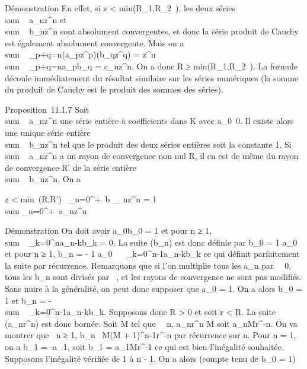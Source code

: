 \documentclass[]{article}
\begin{document}
Démonstration En effet, si \textbar{}z\textbar{}
\textless{} min(R\_1,R\_2~),
les deux séries \\sum ~
a\_nz^n et
\\sum ~
b\_nz^n sont absolument convergentes, et donc la
série produit de Cauchy est également absolument convergente. Mais on a
\\sum ~
\_p+q=n(a\_pz^p)(b\_qz^q) =
z^n \\sum ~
\_p+q=na\_pb\_q = c\_nz^n. On a
donc R ≥ min(R\_1,R\_2~). La
formule découle immédiatement du résultat similaire sur les séries
numériques (la somme du produit de Cauchy est le produit des sommes des
séries).

Proposition~11.1.7 Soit
\\sum ~
a\_nz^n une série entière à coefficients dans K avec
a\_0\neq~0. Il existe alors une unique
série entière \\sum ~
b\_nz^n tel que le produit des deux séries entières
soit la constante 1. Si
\\sum ~
a\_nz^n a un rayon de convergence non nul R, il en
est de même du rayon de convergence R' de la série entière
\\sum ~
b\_nz^n. On a

\textbar{}z\textbar{} \textless{} min~(R,R')
\rigtharrow~\sum \_n=0^+\infty~b~\_
nz^n = 1 \over \\sum
\_n=0^+\infty~a\_nz^n

Démonstration On doit avoir a\_0b\_0 = 1 et pour n ≥ 1,
\\sum ~
\_k=0^na\_n-kb\_k = 0. La suite
(b\_n) est donc définie par b\_0 = 1
\over a\_0 et pour n ≥ 1, b\_n = - 1
\over a\_0 \
\sum ~
\_k=0^n-1a\_n-kb\_k ce qui définit
parfaitement la suite par récurrence. Remarquons que si l'on multiplie
tous les a\_n par \lambda~\neq~0, tous les
b\_n sont divisés par \lambda~, et les rayons de convergence ne sont
pas modifiés. Sans nuire à la généralité, on peut donc supposer que
a\_0 = 1. On a alors b\_0 = 1 et b\_n =
-\\sum ~
\_k=0^n-1a\_n-kb\_k. Supposons donc R
\textgreater{} 0 et soit r \textless{} R. La suite
(a\_nr^n) est donc bornée. Soit M tel que
\forall~~n,
\textbar{}a\_n\textbar{}r^n \leq M soit
\textbar{}a\_n\textbar{}\leq Mr^-n. On va montrer que
\forall~n ≥ 1, \textbar{}b\_n~\textbar{}\leq
M(M + 1)^n-1r^-n par récurrence sur n. Pour n = 1,
on a b\_1 = -a\_1, soit \textbar{}b\_1\textbar{}
= \textbar{}a\_1\textbar{}\leq Mr^-1 ce qui est bien
l'inégalité souhaitée. Supposons l'inégalité vérifiée de 1 à n - 1. On a
alors (compte tenu de b\_0 = 1)
\end{document}

